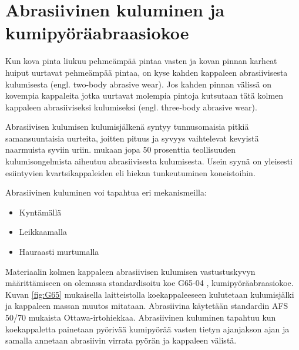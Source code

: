 \documentclass[12pt,a4paper,finnish]{tutthesis}
\begin{document}
\chapter{Abrasiivinen kuluminen ja kumipyöräabraasiokoe}
\label{ch:kumip}


Kun kova pinta liukuu pehmeämpää pintaa vasten ja kovan pinnan
karheat huiput uurtavat pehmeämpää pintaa, on kyse kahden kappaleen abrasiivisesta kulumisesta
(engl. two-body abrasive wear). Jos kahden pinnan välissä on kovempia kappaleita
jotka uurtavat molempia pintoja kutsutaan tätä kolmen kappaleen
abrasiiviseksi kulumiseksi (engl. three-body abrasive wear).

Abrasiivisen kulumisen kulumisjälkenä syntyy tunnusomaisia
pitkiä samansuuntaisia uurteita, joitten pituus ja syvyys vaihtelevat
kevyistä naarmuista syviin uriin. \textcite[s.~179]{williamsengineering}
mukaan jopa 50 prosenttia teollisuuden kulumisongelmista
aiheutuu abrasiivisesta kulumisesta. Usein syynä on yleisesti
esiintyvien kvartsikappaleiden eli hiekan tunkeutuminen koneistoihin.

Abrasiivinen kuluminen voi tapahtua eri mekanismeilla:

\begin{itemize}
\item Kyntämällä
\item Leikkaamalla
\item Hauraasti murtumalla \parencite[s.~109]{kivioja1997}
\end{itemize}


Materiaalin kolmen kappaleen abrasiivisen kulumisen vastustuskyvyn määrittämiseen
on olemassa standardisoitu koe G65-04 \parencite{Standard2010},
kumipyöräabraasiokoe.
Kuvan \ref{fig:G65} mukaisella laitteistolla koekappaleeseen
kulutetaan kulumisjälki ja kappaleen massan muutos mitataan. Abrasiivina
käytetään standardin AFS 50/70 \parencite{foundrysand} mukaista Ottawa-irtohiekkaa.
Abrasiivinen kuluminen tapahtuu kun koekappaletta painetaan pyörivää
kumipyörää vasten tietyn ajanjakson ajan ja samalla annetaan abrasiivin virrata pyörän ja kappaleen
välistä.
\end{document}
